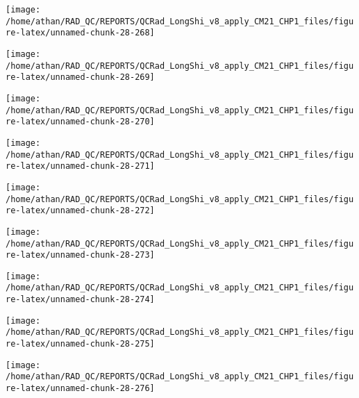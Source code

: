 \documentclass[
  10pt,
  a4paper,oneside]{article}
\begin{document}
\begin{center}\texttt{[image: /home/athan/RAD\_QC/REPORTS/QCRad\_LongShi\_v8\_apply\_CM21\_CHP1\_files/figure-latex/unnamed-chunk-28-268]} \end{center}

\begin{center}\texttt{[image: /home/athan/RAD\_QC/REPORTS/QCRad\_LongShi\_v8\_apply\_CM21\_CHP1\_files/figure-latex/unnamed-chunk-28-269]} \end{center}

\begin{center}\texttt{[image: /home/athan/RAD\_QC/REPORTS/QCRad\_LongShi\_v8\_apply\_CM21\_CHP1\_files/figure-latex/unnamed-chunk-28-270]} \end{center}

\begin{center}\texttt{[image: /home/athan/RAD\_QC/REPORTS/QCRad\_LongShi\_v8\_apply\_CM21\_CHP1\_files/figure-latex/unnamed-chunk-28-271]} \end{center}

\begin{center}\texttt{[image: /home/athan/RAD\_QC/REPORTS/QCRad\_LongShi\_v8\_apply\_CM21\_CHP1\_files/figure-latex/unnamed-chunk-28-272]} \end{center}

\begin{center}\texttt{[image: /home/athan/RAD\_QC/REPORTS/QCRad\_LongShi\_v8\_apply\_CM21\_CHP1\_files/figure-latex/unnamed-chunk-28-273]} \end{center}

\begin{center}\texttt{[image: /home/athan/RAD\_QC/REPORTS/QCRad\_LongShi\_v8\_apply\_CM21\_CHP1\_files/figure-latex/unnamed-chunk-28-274]} \end{center}

\begin{center}\texttt{[image: /home/athan/RAD\_QC/REPORTS/QCRad\_LongShi\_v8\_apply\_CM21\_CHP1\_files/figure-latex/unnamed-chunk-28-275]} \end{center}

\begin{center}\texttt{[image: /home/athan/RAD\_QC/REPORTS/QCRad\_LongShi\_v8\_apply\_CM21\_CHP1\_files/figure-latex/unnamed-chunk-28-276]} \end{center}
\end{document}
